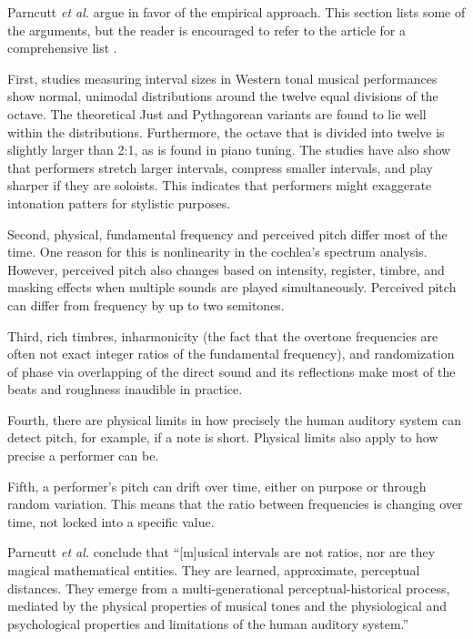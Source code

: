 Parncutt \textit{et al.} argue in favor of the empirical approach. This section lists some of the arguments, but the reader is encouraged to refer to the article for a comprehensive list \cite{parncutt2018psychocultural}. 

First, studies measuring interval sizes in Western tonal musical performances show normal, unimodal distributions around the twelve equal divisions of the octave. The theoretical Just and Pythagorean variants are found to lie well within the distributions. Furthermore, the octave that is divided into twelve is slightly larger than 2:1, as is found in piano tuning. The studies have also show that performers stretch larger intervals, compress smaller intervals, and play sharper if they are soloists. This indicates that performers might exaggerate intonation patters for stylistic purposes. 

Second, physical, fundamental frequency and perceived pitch differ most of the time. One reason for this is nonlinearity in the cochlea’s spectrum analysis. However, perceived pitch also changes based on intensity, register, timbre, and masking effects when multiple sounds are played simultaneously. Perceived pitch can differ from frequency by up to two semitones. 

Third, rich timbres, inharmonicity (the fact that the overtone frequencies are often not exact integer ratios of the fundamental frequency), and randomization of phase via overlapping of the direct sound and its reflections make most of the beats and roughness inaudible in practice.

Fourth, there are physical limits in how precisely the human auditory system can detect pitch, for example, if a note is short. Physical limits also apply to how precise a performer can be.

Fifth, a performer's pitch can drift over time, either on purpose or through random variation. This means that the ratio between frequencies is changing over time, not locked into a specific value.

Parncutt \textit{et al.} conclude that ``[m]usical intervals are not ratios, nor are they magical mathematical entities. They are learned, approximate, perceptual distances. They emerge from a multi-generational perceptual-historical process, mediated by the physical properties of musical tones and the physiological and psychological properties and limitations of the human auditory system.''

